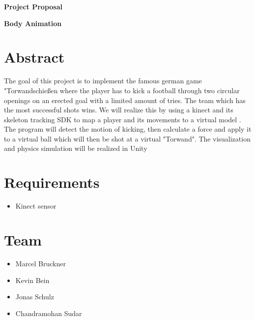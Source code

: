 \documentclass[a4paper,pagesize 10pt]{scrartcl}
\begin{document}
\begin{center}{\Huge\textbf{Project Proposal}}\end{center}
\begin{center}{\Large\textbf{Body Animation}}\end{center}

\section{Abstract}

%
%
%
%

The goal of this project is to implement the famous german game "Torwandschie\ss en where the player has to kick a football through two circular openings on an erected goal with a limited amount of tries. 
The team which has the most successful shots wins.
We will realize this by using a kinect and its skeleton tracking SDK \cite{kinect_basic} to map a player and its movements to a virtual model \cite{source0}.
The program will detect the motion of kicking, then calculate a force and apply it to a virtual ball which will then be shot at a virtual "Torwand". 
The visualization and physics simulation will be realized in Unity \cite{unity}


\section{Requirements}
\begin{itemize}	
	\item Kinect sensor
\end{itemize}

\section{Team}
\begin{itemize}
\item Marcel Bruckner
\item Kevin Bein
\item Jonas Schulz
\item Chandramohan Sudar
\end{itemize}


{\small
	
	
}
\end{document}
